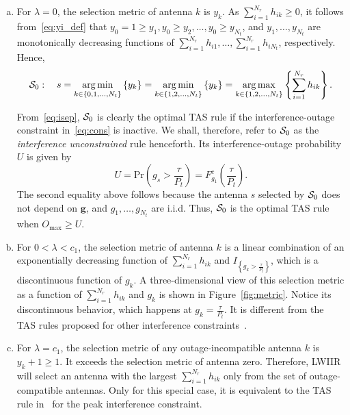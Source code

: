 \documentclass[12pt,draftcls,peerreview,onecolumn]{IEEEtran}
\newcommand{\brac}[1]{\left({#1}\right)}
\newcommand{\cbrac}[1]{\left\{{#1}\right\}}
\newcommand{\indic}[1]{I_{\cbrac{#1}}}
\newcommand{\ie}{{i.e.}}
\newcommand{\prob}[1]{\text{Pr}\brac{#1}}
\DeclareMathOperator*{\argmin}{arg\,min}
\DeclareMathOperator*{\argmax}{arg\,max}
\newcommand{\nx}{{0}}
\newcommand{\lam}{\lambda}
\newcommand{\Nt}{{N_t}}
\newcommand{\Nr}{{N_r}}
\newcommand{\Pt}{{P_t}}
\newcommand{\such}{h}
\newcommand{\puch}{g}
\newcommand{\hk}[1]{{\such_{#1}}}
\newcommand{\gk}[1]{{\puch_{#1}}}
\newcommand{\g}{\mathbf{\puch}}
\newcommand{\outmax}{O_{\text{max}}}
\newcommand{\itau}{\tau}
\newcommand{\cone}{c_{1}}
\newcommand{\taubypt}{\frac{\itau}{\Pt}}
\newcommand{\gkgrtaubypt}[1]{{\gk{#1}}>\taubypt}
\newcommand{\yk}[1]{y_{#1}}
\newcommand{\un}{U}
\newcommand{\allopts}{\left\{\nx,1,\ldots,\Nt\right\}}
\newcommand{\antopts}{\left\{1,2,\ldots,\Nt\right\}}
\newcommand{\caluncons}{{\cal S_{\text{0}}}}
\newcommand{\sumnr}{\sum_{i=1}^{\Nr}}
\begin{document}
\begin{enumerate}[a.]
\item For $\lam=0$, the selection metric of antenna $k$ is $\yk{k}$. As $\sumnr\hk{ik}\geq 0$, it follows from~\eqref{eq:yi_def} that $\yk{0}=1\geq\yk{1},\yk{0}\geq\yk{2},\ldots,\yk{0}\geq\yk{\Nt}$, and   $\yk{1},\ldots,\yk{\Nt}$ are monotonically decreasing functions of $\sumnr\hk{i1},\ldots,\sumnr\hk{i\Nt}$, respectively. Hence, 
\begin{equation}
\caluncons:\quad s=\argmin\limits_{k\in\allopts} \left\{ \yk{k} \right\} = \argmin\limits_{k\in\antopts} \left\{ \yk{k} \right\} = \argmax\limits_{k\in\antopts} \left\{\sumnr \hk{ik} \right\}.
\label{eq:uncons_simple}
\end{equation}

From~\eqref{eq:isep}, $\caluncons$ is clearly the optimal TAS rule if the interference-outage constraint in~\eqref{eq:cons} is inactive. We shall, therefore, refer to $\caluncons$ as the {\em interference unconstrained} rule henceforth. Its interference-outage probability $\un$ is given by
%
\begin{equation}
\un= \prob{\gk{s}>\taubypt}= F^c_{\gk{1}}\!\!\left({\taubypt}\right).
\label{eq:uncomsoutage}
\end{equation}
%
The second equality above follows because the antenna $s$ selected by $\caluncons$ does not depend on $\g$, and $\gk{1},\ldots,\gk{\Nt}$ are i.i.d. Thus, $\caluncons$ is the optimal TAS rule when $\outmax \geq \un$. 

\item For $0<\lam<\cone$, the selection metric of antenna $k$ is a linear combination of  an exponentially decreasing function of $\sumnr\hk{ik}$ and $\indic{\gkgrtaubypt{k}}$, which is a discontinuous function of $\gk{k}$. A three-dimensional view of this selection metric as a function of $\sumnr\hk{ik}$ and $\gk{k}$ is shown in Figure~\ref{fig:metric}. Notice its discontinuous behavior, which happens at $\gk{k}=\taubypt$. It is different from the TAS rules proposed for other interference constraints~\cite{Fakhan_2014_TSP,Wang_2010_TWC,Wang_2011_TCom,Sarvendranath_2013_TCOM,Sarvendranath_2014_TCOM}.

\item For $\lam=\cone$, the selection metric of any outage-incompatible antenna $k$ is  $\yk{k}+1\geq 1$. It exceeds the selection metric of antenna zero. Therefore, LWIIR will select an antenna with the largest $\sumnr\hk{ik}$ only from the set of outage-compatible antennas. Only for this special case, it is equivalent to the TAS rule in~\cite{Hanif_2015_globecom}  for the peak interference constraint.


\end{enumerate}
\end{document}
